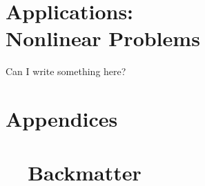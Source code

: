 \documentclass[10pt]{newsiambook}
\begin{document}


\part{Applications:\\Nonlinear Problems}
Can I write something here?





\part{Appendices}
\appendix

%
%
%
%

\part{\ \ Backmatter}
\backmatter
%
%
%
%



\printindex
\end{document}
